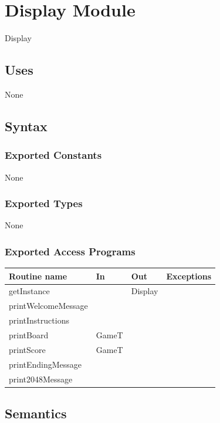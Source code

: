 \documentclass[12pt]{article}
\begin{document}
\newpage

\section* {Display Module}

Display

\subsection* {Uses}

None

\subsection* {Syntax}

\subsubsection* {Exported Constants}

None

\subsubsection* {Exported Types}

None

\subsubsection* {Exported Access Programs}

\begin{tabular}{| l | l | l | p{5cm} |}
  \hline
  \textbf{Routine name} & \textbf{In} & \textbf{Out} & \textbf{Exceptions}\\
  \hline
  getInstance &  & Display & ~\\
  \hline
  printWelcomeMessage &  &  & ~\\
  \hline
  printInstructions &  &  & ~\\
  \hline
  printBoard & GameT &  & ~\\
  \hline
  printScore & GameT &  & ~\\
  \hline
  printEndingMessage &  &  & ~\\
  \hline
  print2048Message &  &  & ~\\
  \hline
  
\end{tabular}


\subsection* {Semantics}
\end{document}

